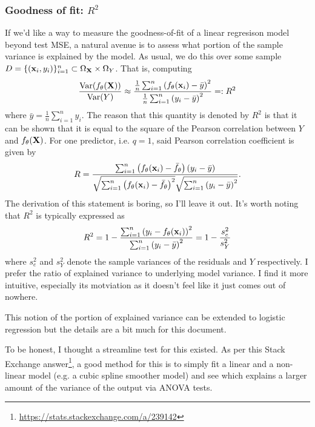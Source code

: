 \documentclass[11pt]{article}
\begin{document}
\subsubsection{Goodness of fit: $R^2$}
If we'd like a way to measure the goodness-of-fit of a linear regresison model beyond test MSE, a natural avenue is to assess what portion of the sample variance is explained by the model. As usual, we do this over some sample $D=\{(\mathbf{x}_i,y_i)\}_{i=1}^n\subset\Omega_{\mathbf{X}}\times\Omega_{Y}$. That is, computing
$$
\frac{\text{Var}(f_{\theta}(\mathbf{X}))}{\text{Var}(Y)}
\approx
\frac{\frac{1}{n}\sum_{i=1}^n\left(f_{\theta}(\mathbf{x}_i)-\bar{y}\right)^2}{\frac{1}{n}\sum_{i=1}^n\left(y_i-\bar{y}\right)^2}
=:
R^2
$$
where $\bar{y}=\frac{1}{n}\sum_{i=1}^ny_i$. The reason that this quantity is denoted by $R^2$ is that it can be shown that it is equal to the square of the Pearson correlation between $Y$ and $f_{\theta}(\mathbf{X})$. For one predictor, i.e. $q=1$, said Pearson correlation coefficient is given by
$$
R
=
\frac{\sum_{i=1}^n\left(f_{\theta}(\mathbf{x}_i)-\bar{f}_{\theta}\right)(y_i-\bar{y})}{\sqrt{\sum_{i=1}^n\left(f_{\theta}(\mathbf{x}_i)-\bar{f}_{\theta}\right)^2}\sqrt{\sum_{i=1}^n\left(y_i-\bar{y}\right)^2}}.
$$
The derivation of this statement is boring, so I'll leave it out. It's worth noting that $R^2$ is typically expressed as
$$
R^2
=
1-\frac{\sum_{i=1}^n\left(y_i-f_{\theta}(\mathbf{x}_i)\right)^2}{\sum_{i=1}^n\left(y_i-\bar{y}\right)^2}
=
1-\frac{s_e^2}{s_Y^2}
$$
where $s_e^2$ and $s_Y^2$ denote the sample variances of the residuals and $Y$ respectively. I prefer the ratio of explained variance to underlying model variance. I find it more intuitive, especially its motviation as it doesn't feel like it just comes out of nowhere.

This notion of the portion of explained variance can be extended to logistic regression but the details are a bit much for this document.

\begin{tcolorbox}[title={\centering\textbf{How can we get an idea of the extent to which our features and output are linearly related without plotting?}}, colback=myLightBlue, colbacktitle=myDarkBlue, colframe=myDarkBlue, coltitle=white]
    To be honest, I thought a streamline test for this existed. As per this Stack Exchange answer\footnote{\url{https://stats.stackexchange.com/a/239142}}, a good method for this is to simply fit a linear and a non-linear model (e.g. a cubic spline smoother model) and see which explains a larger amount of the variance of the output via ANOVA tests.
\end{tcolorbox}
\end{document}
